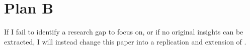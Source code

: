 \documentclass[journal,onecolumn]{IEEEtran}
\begin{document}
\section{Plan B}

If I fail to identify a research gap to focus on, or if no original insights can be extracted, I will instead change this paper into a replication and extension of \cite{Kumar22}.



\end{document}
